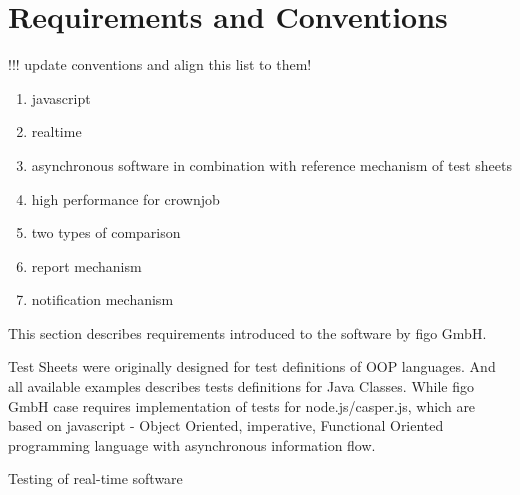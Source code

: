 \chapter{Requirements and Conventions}
\label{sec:reqiorements}

	!!! update conventions and align this list to them!
	\begin{enumerate}
		\item javascript
		\item realtime
		\item asynchronous software in combination with reference mechanism of test sheets
		\item high performance for crownjob
		\item two types of comparison
		\item report mechanism
		\item notification mechanism
		
	\end{enumerate}
	
	This section describes requirements introduced to the software by figo GmbH.
	
	
	
	
	Test Sheets were originally designed for test definitions of OOP languages. And all available examples describes tests definitions for Java Classes. While figo GmbH case requires implementation of tests for node.js/casper.js, which are based on javascript - Object Oriented, imperative, Functional Oriented programming language with asynchronous information flow.
	
	Testing of real-time software
	
